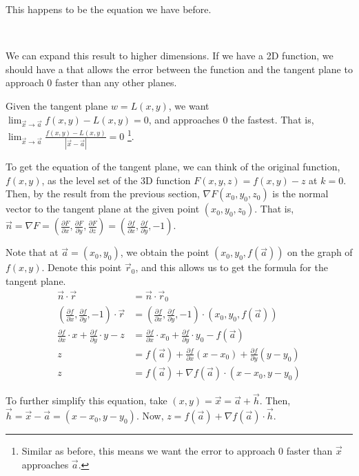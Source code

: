 \documentclass[11pt,fleqn]{book} %
\begin{document}
This happens to be the equation we have before. 

{~~~}

We can expand this result to higher dimensions. If we have a 2D function, we should have a  that allows the error between the function and the tangent plane to approach $0$ faster than any other planes. 

Given the tangent plane $w = L(x,y)$, we want $\lim_{\vec{x}\to\vec{a}} f(x,y) - L(x,y) = 0$, and approaches $0$ the fastest. That is, $\lim_{\vec{x}\to\vec{a}} \frac{f(x,y) - L(x,y)}{| \vec{x} - \vec{a} |} = 0$ \footnote{Similar as before, this means we want the error to approach $0$ faster than $\vec{x}$ approaches $\vec{a}$. }. 

To get the equation of the tangent plane, we can think of the original function, $f(x,y)$, as the level set of the 3D function $F(x,y,z) = f(x,y) - z$ at $k = 0$. Then, by the result from the previous section, $\nabla F(x_0,y_0,z_0)$ is the normal vector to the tangent plane at the given point $(x_0,y_0,z_0)$. That is, $\vec{n} = \nabla F = \left( \frac{\partial F}{\partial x}, \frac{\partial F}{\partial y}, \frac{\partial F}{\partial z} \right) = \left( \frac{\partial f}{\partial x}, \frac{\partial f}{\partial y}, -1 \right)$. 

Note that at $\vec{a} = (x_0, y_0)$, we obtain the point $(x_0, y_0, f(\vec{a}))$ on the graph of $f(x,y)$. Denote this point $\vec{r}_0$, and this allows us to get the formula for the tangent plane. 
\begin{align*}
    \vec{n} \cdot \vec{r}
    &= \vec{n} \cdot \vec{r}_0 \\
    \left( \frac{\partial f}{\partial x}, \frac{\partial f}{\partial y}, -1 \right) \cdot \vec{r} 
    &= \left( \frac{\partial f}{\partial x}, \frac{\partial f}{\partial y}, -1 \right) \cdot \left( x_0, y_0, f(\vec{a}) \right) \\
    \frac{\partial f}{\partial x} \cdot x + \frac{\partial f}{\partial y} \cdot y - z 
    &= \frac{\partial f}{\partial x} \cdot x_0 + \frac{\partial f}{\partial y} \cdot y_0 - f(\vec{a}) \\
    z
    &= f(\vec{a}) + \frac{\partial f}{\partial x} (x - x_0) + \frac{\partial f}{\partial y} (y - y_0) \\
    z
    &= f(\vec{a}) + \nabla f(\vec{a}) \cdot (x-x_0, y-y_0)
\end{align*}

To further simplify this equation, take $(x,y) = \vec{x} = \vec{a} + \vec{h}$. Then, $\vec{h} = \vec{x} - \vec{a} = (x - x_0, y - y_0)$. Now, $z = f(\vec{a}) + \nabla f(\vec{a}) \cdot \vec{h}$. 
\end{document}

